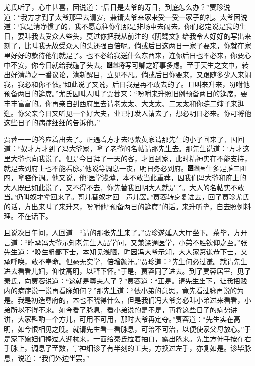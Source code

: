 尤氏听了，心中甚喜，因说道：“后日是太爷的寿日，到底怎么办？”贾珍说道：“我方才到了太爷那里去请安，兼请太爷来家来受一受一家子的礼。太爷因说道：‘我是清净惯了的，我不愿意往你们那是非场中去闹去。你们必定说是我的生日，要叫我去受众人些头，莫过你把我从前注的《阴骘文》给我令人好好的写出来刻了，比叫我无故受众人的头还强百倍呢。倘或后日这两日一家子要来，你就在家里好好的款待他们就是了。也不必给我送什么东西来，连你后日也不必来，你要心中不安，你今日就给我磕了头去。{\includegraphics[width=3mm]{../Images/00006}\includegraphics[width=3mm]{../Images/00011}\footnotesize \kaishu 将写可卿之好事多虑。至于天生之文中，转出好清静之一番议论，清新醒目，立见不凡。}倘或后日你要来，又跟随多少人来闹我，我必和你不依。’如此说了又说，后日我是再不敢去的了。且叫来升来，吩咐他预备两日的筵席。”尤氏因叫人叫了贾蓉来：“吩咐来升照旧例预备两日的筵席，要丰丰富富的。你再亲自到西府里去请老太太、大太太、二太太和你琏二婶子来逛逛。你父亲今日又听见一个好大夫，业已打发人请去了，想必明日必来。你可将他这些日子的病症细细的告诉他。”

贾蓉一一的答应着出去了。正遇着方才去冯紫英家请那先生的小子回来了，因回道：“奴才方才到了冯大爷家，拿了老爷的名帖请那先生去。那先生说道：‘方才这里大爷也向我说了。但是今日拜了一天的客，才回到家，此时精神实在不能支持，就是去到府上也不能看脉。’他说等调息一夜，明日务必到府。{\includegraphics[width=3mm]{../Images/00006}\includegraphics[width=3mm]{../Images/00011}\footnotesize \kaishu 医生多是推三阻四，拿腔作调。}他又说，他‘医学浅薄，本不敢当此重荐，因我们冯大爷和府上的大人既已如此说了，又不得不去，你先替我回明大人就是了。大人的名帖实不敢当。’仍叫奴才拿回来了。哥儿替奴才回一声儿罢。”贾蓉转身复进去，回了贾珍尤氏的话，方出来叫了来升来，吩咐他“预备两日的筵席”的话。来升听毕，自去照例料理。不在话下。

且说次日午间，人回道：“请的那张先生来了。”贾珍遂延入大厅坐下。茶毕，方开言道：“昨承冯大爷示知老先生人品学问，又兼深通医学，小弟不胜钦仰之至。”张先生道：“晚生粗鄙下士，本知见浅陋，昨因冯大爷示知，大人家第谦恭下士，又承呼唤，敢不奉命。但毫无实学，倍增颜汗。”贾珍道：“先生何必过谦。就请先生进去看看儿妇，仰仗高明，以释下怀。”于是，贾蓉同了进去。到了贾蓉居室，见了秦氏，向贾蓉说道：“这就是尊夫人了？”贾蓉道：“正是。请先生坐下，让我把贱内的病症说一说再看脉如何？”那先生道：“依小弟的意思，竟先看过脉再说的为是。我是初造尊府的，本也不晓得什么，但是我们冯大爷务必叫小弟过来看看，小弟所以不得不来。如今看了脉息，看小弟说的是不是，再将这些日子的病势讲一讲，大家斟酌一个方儿，可用不可用，那时大爷再定夺。”贾蓉道：“先生实在高明，如今恨相见之晚。就请先生看一看脉息，可治不可治，以便使家父母放心。”于是家下媳妇们捧过大迎枕来，一面给秦氏拉着袖口，露出脉来。先生方伸手按在右手脉上，调息了至数，宁神细诊了有半刻的工夫，方换过左手，亦复如是。诊毕脉息，说道：“我们外边坐罢。”

